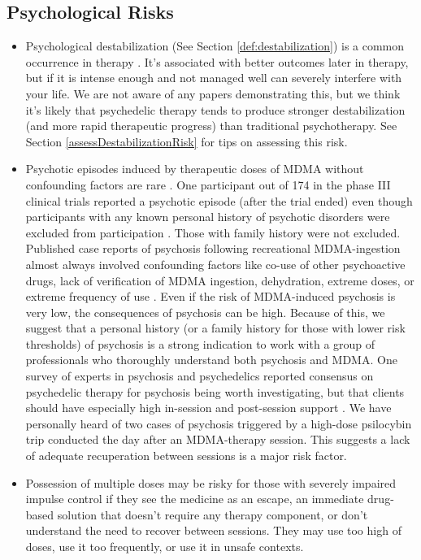 \documentclass[12pt,letterpaper]{book}
\begin{document}
\subsection*{Psychological Risks}
\begin{itemize}
    \item Psychological destabilization (See Section \ref{def:destabilization}) is a common occurrence in therapy \cite{olthofDestabilization}. It's associated with better outcomes later in therapy, but if it is intense enough and not managed well can severely interfere with your life. We are not aware of any papers demonstrating this, but we think it's likely that psychedelic therapy tends to produce stronger destabilization (and more rapid therapeutic progress) than traditional psychotherapy. See Section \ref{assessDestabilizationRisk} for tips on assessing this risk.
    \item Psychotic episodes induced by therapeutic doses of MDMA without confounding factors are rare \cite{arnovitzSchizophrenia}. One participant out of 174 in the phase III clinical trials reported a psychotic episode (after the trial ended) even though participants with any known personal history of psychotic disorders were excluded from participation \cite{powerTrip,smithSystematic,mitchellMDMAClinicalTrial2}. Those with family history were not excluded. Published case reports of psychosis following recreational MDMA-ingestion almost always involved confounding factors like co-use of other psychoactive drugs, lack of verification of MDMA ingestion, dehydration, extreme doses, or extreme frequency of use \cite{mcguirePsychosis,patelPsychosis,vaivaPsychosis}. Even if the risk of MDMA-induced psychosis is very low, the consequences of psychosis can be high. Because of this, we suggest that a personal history (or a family history for those with lower risk thresholds) of psychosis is a strong indication to work with a group of professionals who thoroughly understand both psychosis and MDMA. One survey of experts in psychosis and psychedelics reported consensus on psychedelic therapy for psychosis being worth investigating, but that clients should have especially high in-session and post-session support \cite{la2022Psychosis}. We have personally heard of two cases of psychosis triggered by a high-dose psilocybin trip conducted the day after an MDMA-therapy session. This suggests a lack of adequate recuperation between sessions is a major risk factor.
    \item Possession of multiple doses may be risky for those with severely impaired impulse control if they see the medicine as an escape, an immediate drug-based solution that doesn't require any therapy component, or don't understand the need to recover between sessions. They may use too high of doses, use it too frequently, or use it in unsafe contexts.

\end{itemize}
\end{document}
